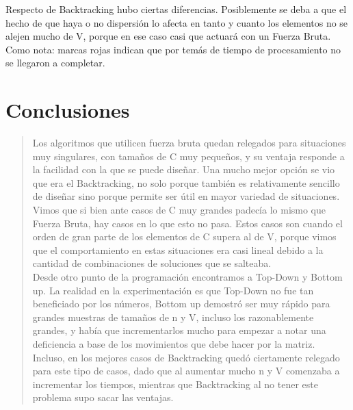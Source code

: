 \documentclass[7pt,a4paper]{article}
\begin{document}
Respecto de Backtracking hubo ciertas diferencias. Posiblemente se deba a que el hecho de que haya o no dispersión lo afecta en tanto y cuanto los elementos no se alejen mucho de V, porque en ese caso casi que actuará con un Fuerza Bruta. Como nota: marcas rojas indican que por temás de tiempo de procesamiento no se llegaron a completar.

\section{Conclusiones}

\begin{verse}
Los algoritmos que utilicen fuerza bruta quedan relegados para situaciones muy singulares, con tamaños de C muy pequeños, y su ventaja responde a la facilidad con la que se puede diseñar. Una mucho mejor opción se vio que era el Backtracking, no solo porque también es relativamente sencillo de diseñar sino porque permite ser útil en mayor variedad de situaciones. Vimos que si bien ante casos de C muy grandes padecía lo mismo que Fuerza Bruta, hay casos en lo que esto no pasa. Estos casos son cuando el orden de gran parte de los elementos de C supera al de V, porque vimos que el comportamiento en estas situaciones era casi lineal debido a la cantidad de combinaciones de soluciones que se salteaba.\\ 
Desde otro punto de la programación encontramos a Top-Down y Bottom up. La realidad en la experimentación es que Top-Down no fue tan beneficiado por los números, Bottom up demostró ser muy rápido para grandes muestras de tamaños de n y V, incluso los razonablemente grandes, y había que incrementarlos mucho para empezar a notar una deficiencia a base de los movimientos que debe hacer por la matriz. Incluso, en los mejores casos de Backtracking quedó ciertamente relegado para este tipo de casos, dado que al aumentar mucho n y V comenzaba a incrementar los tiempos, mientras que Backtracking al no tener este problema supo sacar las ventajas. \\

\end{verse}
\end{document}
